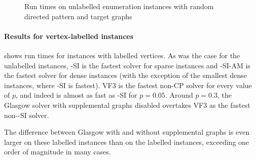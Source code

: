 \begin{figure}[htb]
    \centering
    \caption{Run times on unlabelled enumeration instances with random directed pattern and target graphs}
    \label{figure:unlabelled-vf-instance-runtimes}
\end{figure}

\paragraph*{Results for vertex-labelled instances}

 shows run times for instances with labelled vertices.
As was the case for the unlabelled instances, \McSplit-SI is the fastest solver for sparse instances and \McSplit-SI-AM
is the fastest solver for dense instances (with the exception of the smallest dense instances,
where \McSplit-SI is fastest).  VF3 is the fastest non-CP solver for every value of $p$, and indeed is almost
as fast as \McSplit-SI for $p=0.05$.  Around $p=0.3$, the Glasgow solver
with supplemental graphs disabled overtakes VF3 as the fastest non-\McSplit-SI solver.

The difference between Glasgow with and without supplemental graphs is even larger on these labelled instances
than on the labelled instances, exceeding one order of magnitude in many cases.

